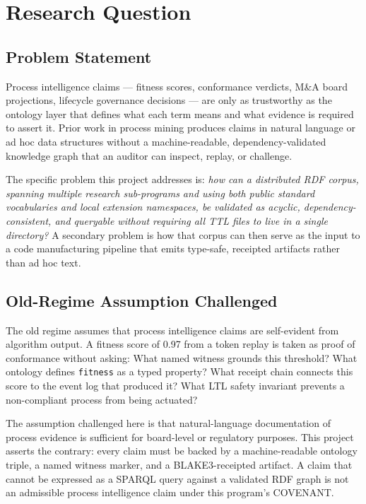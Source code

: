
\section{Research Question}
\label{sec:research-open-ontologies-question}

\subsection{Problem Statement}
\label{sec:research-open-ontologies-problem}

Process intelligence claims --- fitness scores, conformance verdicts, M\&A board projections,
lifecycle governance decisions --- are only as trustworthy as the ontology layer that defines
what each term means and what evidence is required to assert it. Prior work in process mining
produces claims in natural language or ad hoc data structures without a machine-readable,
dependency-validated knowledge graph that an auditor can inspect, replay, or challenge.

The specific problem this project addresses is: \emph{how can a distributed RDF corpus, spanning
multiple research sub-programs and using both public standard vocabularies and local extension
namespaces, be validated as acyclic, dependency-consistent, and queryable without requiring all
TTL files to live in a single directory?} A secondary problem is how that corpus can then
serve as the input to a code manufacturing pipeline that emits type-safe, receipted artifacts
rather than ad hoc text.

\subsection{Old-Regime Assumption Challenged}
\label{sec:research-open-ontologies-old-regime}

The old regime assumes that process intelligence claims are self-evident from algorithm output.
A fitness score of 0.97 from a token replay is taken as proof of conformance without asking: What
named witness grounds this threshold? What ontology defines \texttt{fitness} as a typed property?
What receipt chain connects this score to the event log that produced it? What LTL safety
invariant prevents a non-compliant process from being actuated?

The assumption challenged here is that natural-language documentation of process evidence is
sufficient for board-level or regulatory purposes. This project asserts the contrary: every
claim must be backed by a machine-readable ontology triple, a named witness marker, and a
BLAKE3-receipted artifact. A claim that cannot be expressed as a SPARQL query against a
validated RDF graph is not an admissible process intelligence claim under this program's
COVENANT.

